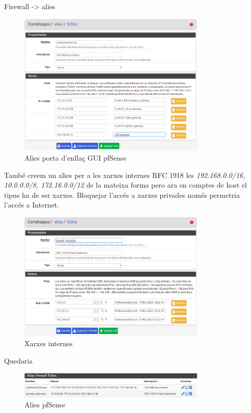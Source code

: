 \documentclass[
  10pt,
]{krantz}
\begin{document}
Firewall -\textgreater{} alies

\begin{figure}
\centering
\includegraphics[width=0.8\textwidth,height=\textheight]{imatges/proxmox/pfsense_gui_acces.png}
\caption{Alies porta d'enllaç GUI pfSense}
\end{figure}

També creem un alies per a les xarxes internes RFC 1918 les \emph{192.168.0.0/16, 10.0.0.0/8, 172.16.0.0/12} de la mateixa forma pero ara en comptes de host el tipus ha de ser xarxes. Bloquejar l'accés a xarxes privades només permetria l'accés a Internet.

\begin{figure}
\centering
\includegraphics[width=0.8\textwidth,height=\textheight]{imatges/proxmox/pfsense_xarxes_internes.png}
\caption{Xarxes internes}
\end{figure}

Quedaria

\begin{figure}
\centering
\includegraphics[width=0.8\textwidth,height=\textheight]{imatges/proxmox/alies_pfsense.png}
\caption{Alies pfSense}
\end{figure}
\end{document}
